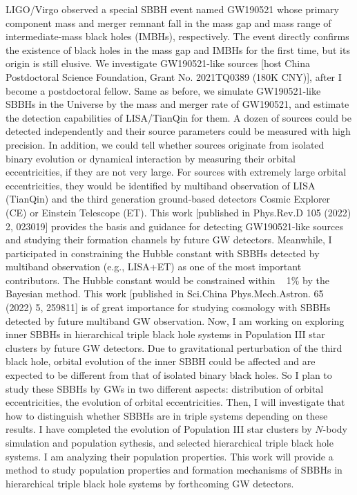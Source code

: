 \documentclass[12pt,a4paper,sans]{article}%
\begin{document}
LIGO/Virgo observed a special SBBH event named
GW190521 whose primary component mass and merger remnant fall in the mass gap and mass range of intermediate-mass black holes (IMBHs), respectively. The event directly confirms the existence of
black holes in the mass gap and IMBHs for the first time, but its origin is still elusive. We investigate GW190521-like sources [host China Postdoctoral Science Foundation, Grant No. 2021TQ0389 (180K CNY)], after I become a postdoctoral fellow. Same as before, we simulate GW190521-like SBBHs in the
Universe by the mass and merger rate of GW190521, and estimate the detection capabilities of LISA/TianQin for them. A
dozen of sources could be detected independently and their source
parameters could be measured with high precision. In addition, we could tell whether sources originate from isolated binary evolution
or dynamical interaction by measuring their orbital eccentricities, if they are not very large. For sources with extremely large orbital
eccentricities, they would be identified by multiband observation of LISA (TianQin) and the third generation
ground-based detectors Cosmic Explorer (CE) or Einstein
Telescope (ET). This work [published in Phys.Rev.D 105 (2022) 2, 023019] provides
the basis and guidance for detecting GW190521-like sources and studying their formation channels by future GW detectors. Meanwhile, I participated in constraining the Hubble
constant with SBBHs detected by multiband observation (e.g., LISA+ET) as one of the most important
contributors. The Hubble constant would be constrained within ~ 1\% by the Bayesian method. This work [published in Sci.China Phys.Mech.Astron. 65 (2022) 5, 259811] is of great
importance for studying cosmology with SBBHs detected by future multiband GW observation. Now, I am working on
exploring inner SBBHs in hierarchical triple black hole systems in Population III star clusters by future GW detectors.
Due to gravitational perturbation of the third black hole, orbital evolution of the inner SBBH could be affected and are
expected to be different from that of isolated binary black holes. So I plan to
study these SBBHs by GWs in two different aspects: distribution of orbital
eccentricities, the evolution of orbital eccentricities. Then, I will investigate that how to distinguish whether SBBHs
are in triple systems depending on these results. I have completed the evolution of
Population III star clusters by $N$-body simulation and population sythesis, and selected hierarchical triple black hole systems. I am analyzing
their population properties. This work will provide a method 
to study population properties and formation mechanisms of SBBHs in hierarchical triple black hole systems by forthcoming GW detectors.
\end{document}
